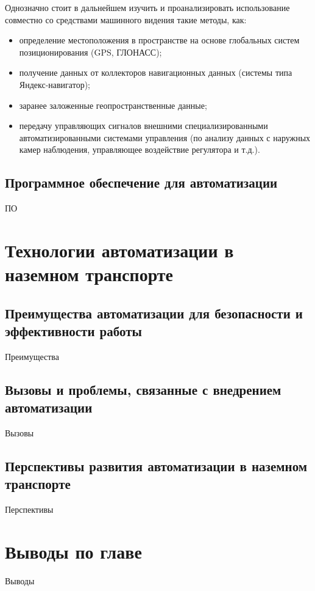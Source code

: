 Однозначно стоит в дальнейшем изучить и проанализировать использование совместно со средствами машинного видения такие методы, как:

\begin{itemize}
    \item определение местоположения в пространстве на основе глобальных систем позиционирования (GPS, ГЛОНАСС);
    \item получение данных от коллекторов навигационных данных (системы типа Яндекс-навигатор);
    \item заранее заложенные геопространственные данные;
    \item передачу управляющих сигналов внешними специализированными автоматизированными системами управления (по анализу данных с наружных камер наблюдения, управляющее воздействие регулятора и т.д.).
\end{itemize}


\subsection{Программное обеспечение для автоматизации}\label{subsec:ch1/sec2/sub3}

ПО

\section{Технологии автоматизации в наземном транспорте}\label{sec:ch1/sec3}

\subsection{Преимущества автоматизации для безопасности и эффективности работы}\label{subsec:ch1/sec3/sub1}

Преимущества

\subsection{Вызовы и проблемы, связанные с внедрением автоматизации}\label{subsec:ch1/sec3/sub2}

Вызовы

\subsection{Перспективы развития автоматизации в наземном транспорте}\label{subsec:ch1/sec3/sub3}

Перспективы

\section{Выводы по главе}\label{sec:ch1/sec4}

Выводы

\FloatBarrier

